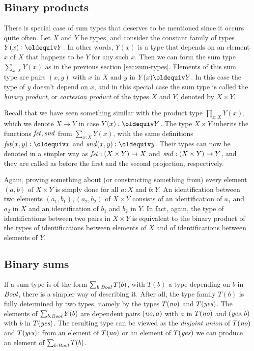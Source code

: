 \subsection{Binary products}
\label{sec:binprod-types}
There is special case of sum types that deserves to be mentioned since
it occurs quite often. Let $X$ and $Y$ be types, and consider the constant
family of types $Y(x)\defeq Y$. In other words, $Y(x)$ is a type that depends
on an element $x$ of $X$ that happens to be $Y$ for any such $x$.
Then we can form the sum type $\sum_{x:X} Y(x)$ as in the previous
section \ref{sec:sum-types}. Elements of this sum type are pairs $(x,y)$
with $x$ in $X$ and $y$ in $Y(x)\jdeq Y$. In this case the type of $y$
doesn't depend on $x$, and in this special case the sum type is called
the \emph{binary product}, or \emph{cartesian product} of the types $X$ and $Y$,
denoted by $X \times Y$.

Recall that we have seen something similar with the product type
$\prod_{x:X} Y(x)$, which we denote $X\to Y$ in case $Y(x)\defeq Y$.
The type $X \times Y$ inherits the functions $\mathop{\mathit{fst}},\mathop{\mathit{snd}}$ from
$\sum_{x:X} Y(x)$, with the same definitions $\fst(x,y)\defeq x$
and $\snd(x,y)\defeq y$. Their types can now be denoted in a
simpler way as $\mathop{\mathit{fst}}: (X \times Y)\to X$ and 
$\mathop{\mathit{snd}}: (X \times Y)\to Y$, and they are called as before the
first and the second projection, respectively.

Again, proving something about (or constructing something from) every 
element $(a,b)$ of $X \times Y$ is simply done for all $a:X$ and $b:Y$.
An identification between two elements $(a_1,b_1),(a_2,b_2)$ of 
$X \times Y$ consists of an identification of $a_1$ and $a_2$ in $X$
and an identification of $b_1$ and $b_2$ in $Y$. In fact, 
again, the type of identifications between two pairs in $X \times Y$
is equivalent to the binary product of the types of identifications between
elements of $X$ and of identifications between elements of $Y$.

\subsection{Binary sums}
\label{sec:binsum-types}
If a sum type is of the form $\sum_{b:\mathop{\mathit{Bool}}} T(b)$, with $T(b)$
a type depending on $b$ in $\mathop{\mathit{Bool}}$, there is a simpler way of
describing it. After all, the type family $T(b)$ is fully determined
by two types, namely by the types $T(\mathop{\mathit{no}})$ and $T(\mathop{\mathit{yes}})$.
The elements of $\sum_{b:\mathop{\mathit{Bool}}} Y(b)$ are dependent pairs $(\mathop{\mathit{no}},a)$ with
$a$ in $T(\mathop{\mathit{no}})$ and $(\mathop{\mathit{yes}},b)$ with $b$ in $T(\mathop{\mathit{yes}})$. The resulting
type can be viewed as the \emph{disjoint union} of $T(\mathop{\mathit{no}})$ and $T(\mathop{\mathit{yes}})$:
from an element of $T(\mathop{\mathit{no}})$ or an element of $T(\mathop{\mathit{yes}})$ 
we can produce an element of $\sum_{b:\mathop{\mathit{Bool}}} T(b)$.  

